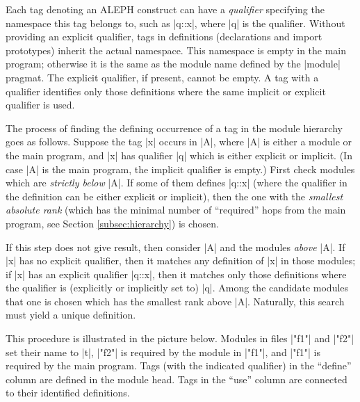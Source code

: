 \documentclass[titlepage]{article}
\newcommand\A{\textsf{ALEPH}}
\newcommand\g[1]{\textsf{#1}}
\def\cc{\kern-0.6pt:\kern-1pt:\kern-0.5pt}
\begin{document}
Each \g{tag} denoting an \A{} construct can have a \emph{qualifier}
specifying the namespace this tag belongs to, such as \pp|q{\cc}x|,
where \pp|q| is the qualifier. Without providing an explicit qualifier, tags
in definitions (declarations and import prototypes) inherit the actual
namespace. This namespace is empty in the main program; otherwise it is the
same as the module name defined by the \pp|module| pragmat. The explicit
qualifier, if present, cannot be empty. A \g{tag} with a qualifier
identifies only those definitions where the same implicit or explicit
qualifier is used.

The process of finding the defining occurrence of a \g{tag} in the module
hierarchy goes as follows. Suppose the \g{tag} \pp|x| occurs in \pp|A|,
where \pp|A| is either a module or the main program, and \pp|x| has
qualifier \pp|q| which is either explicit or implicit. (In case \pp|A| is
the main program, the implicit qualifier is empty.) First check modules
which are \emph{strictly below} \pp|A|. If some of them defines \pp|q{\cc}x|
(where the qualifier in the definition can be either explicit or implicit),
then the one with the \emph{smallest absolute rank} (which has the minimal
number of ``required'' hops from the main program, see Section
\ref{subsec:hierarchy}) is chosen.

If this step does not give result, then consider \pp|A| and the modules
\emph{above} \pp|A|. If \pp|x| has no explicit qualifier, then it matches
any definition of \pp|x| in those modules; if \pp|x| has an explicit
qualifier \pp|q{\cc}x|, then it matches only those definitions where the
qualifier is (explicitly or implicitly set to) \pp|q|. Among the candidate
modules that one is chosen which has the smallest rank above \pp|A|.
Naturally, this search must yield a unique definition.

This procedure is illustrated in the picture below. Modules in files
\pp|"f1"| and \pp|"f2"| set their name to \pp|t|, \pp|"f2"| is required by
the module in \pp|"f1"|, and \pp|"f1"| is required by the main program. Tags
(with the indicated qualifier) in the ``define'' column are defined in the
module head. Tags in the ``use'' column are connected to their identified
definitions.
\end{document}
